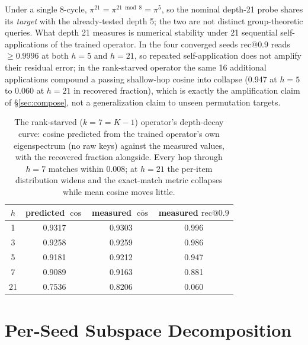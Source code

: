 \documentclass[mlabstract,onecolumn]{jmlr}
\makeatletter
\newcommand{\recninety}{\mathrm{rec}@0.9}
\makeatother
\begin{document}
Under a single 8-cycle, $\pi^{21} = \pi^{21 \bmod 8} = \pi^{5}$, so the
nominal depth-21 probe shares its \emph{target} with the already-tested
depth 5; the two are not distinct group-theoretic queries. What depth 21
measures is numerical stability under 21 sequential self-applications of
the trained operator. In the four converged seeds $\recninety$ reads
$\geq 0.9996$ at both $h{=}5$ and $h{=}21$, so repeated self-application
does not amplify their residual error;
in the rank-starved operator the same 16 additional applications
compound a passing shallow-hop cosine into collapse (0.947 at $h{=}5$
to 0.060 at $h{=}21$ in recovered fraction),
which is exactly the amplification claim of \S\ref{sec:compose}, not a
generalization claim to unseen permutation targets.

\begin{table}[!htb]
\centering
\small
\begin{tabular}{cccc}
\toprule
$h$ & predicted $\cos$ & measured $\overline{\cos}$ & measured $\recninety$ \\
\midrule
1  & 0.9317 & 0.9303 & 0.996 \\
3  & 0.9258 & 0.9259 & 0.986 \\
5  & 0.9181 & 0.9212 & 0.947 \\
7  & 0.9089 & 0.9163 & 0.881 \\
21 & 0.7536 & 0.8206 & 0.060 \\
\bottomrule
\end{tabular}
\caption{The rank-starved ($k = 7 = K - 1$) operator's depth-decay
curve: cosine predicted from the trained operator's own eigenspectrum
(no raw keys) against the measured values, with the recovered fraction
alongside. Every hop through $h = 7$ matches within 0.008; at $h = 21$
the per-item distribution widens and the exact-match metric collapses
while mean cosine moves little.}
\label{tab:depthcurve}
\end{table}

\section{Per-Seed Subspace Decomposition}
\label{app:subspace}
\end{document}

